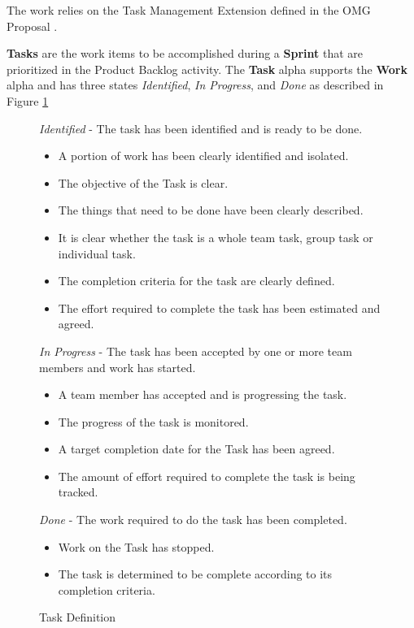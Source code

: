 \documentclass[preprint,12pt,3p]{elsarticle}
\begin{document}

The work relies on the Task Management Extension defined in the OMG Proposal \cite{OMGStandard}. 

\textbf{Tasks} are the work items to be accomplished during a \textbf{Sprint} that are prioritized in the Product Backlog activity. The \textbf{Task} alpha supports the \textbf{Work} alpha and has three states \textit{Identified}, \textit{In Progress}, and \textit{Done} as described in Figure \ref{TaskDefinition}

\begin{figure}[h]\vspace*{4pt}
\caption{Task Definition}\vspace*{-6pt}\label{TaskDefinition}
\textit{Identified} - The task has been identified and is ready to be done.
\begin{itemize}
\item A portion of work has been clearly identified and isolated.
\item The objective of the Task is clear.
\item The things that need to be done have been clearly described.
\item It is clear whether the task is a whole team task, group task or individual task.
\item The completion criteria for the task are clearly defined.
\item The effort required to complete the task has been estimated and agreed.
\end{itemize}

\textit{In Progress} - The task has been accepted by one or more team members and work has started.
\begin{itemize}
\item A team member has accepted and is progressing the task.
\item The progress of the task is monitored.
\item A target completion date for the Task has been agreed. 
\item The amount of effort required to complete the task is being tracked.
\end{itemize}

\textit{Done} - The work required to do the task has been completed.
\begin{itemize}
\item Work on the Task has stopped.
\item The task is determined to be complete according to its completion criteria. 
\end{itemize}
\end{figure}
\end{document}
